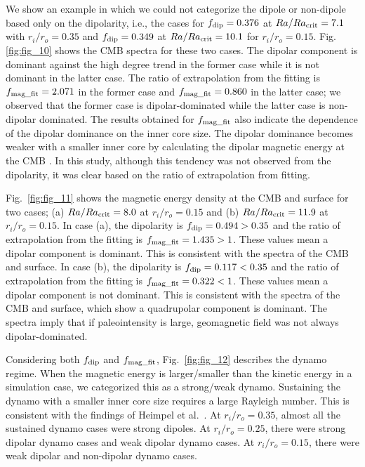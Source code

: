 We show an example in which we could not categorize the dipole or non-dipole based only on the dipolarity, i.e., the cases for $f_{\rm dip} = 0.376$ at $Ra/Ra_{\rm crit} = 7.1$ with $r_i/r_o = 0.35$ and $f_{\rm dip} = 0.349$ at $Ra/Ra_{\rm crit} = 10.1$ for $r_i/r_o = 0.15$. 
Fig. \ref{fig:fig_10} shows the CMB spectra for these two cases. 
The dipolar component is dominant against the high degree trend in the former case while it is not dominant in the latter case. 
The ratio of extrapolation from the fitting is $f_{\rm mag\_fit} = 2.071$ in the former case and $f_{\rm mag\_fit} = 0.860$ in the latter case; we observed that the former case is dipolar-dominated while the latter case is non-dipolar dominated. 
The results obtained for $f_{\rm mag\_fit}$  also indicate the dependence of the dipolar dominance on the inner core size. 
The dipolar dominance becomes weaker with a smaller inner core by calculating the dipolar magnetic energy at the CMB \cite{Heimpel:2005}. 
In this study, although this tendency was not observed from the dipolarity, it was clear based on the ratio of extrapolation from fitting.

{\color{red}
Fig.~\ref{fig:fig_11} shows the magnetic energy density at the CMB and surface for two cases; (a) $Ra/Ra_{\rm crit} = 8.0$ at $r_i/r_o = 0.15$ and (b) $Ra/Ra_{\rm crit} = 11.9$ at $r_i/r_o = 0.15$. 
In case (a), the dipolarity is $f_{\rm dip} = 0.494 > 0.35$ and the ratio of extrapolation from the fitting is $f_{\rm mag\_fit} = 1.435 > 1$. 
These values mean a dipolar component is dominant. 
This is consistent with the spectra of the CMB and surface. 
In case (b), the dipolarity is $f_{\rm dip} = 0.117 < 0.35$ and the ratio of extrapolation from the fitting is $f_{\rm mag\_fit} = 0.322 < 1$. 
These values mean a dipolar component is not dominant. 
This is consistent with the spectra of the CMB and surface, which show a quadrupolar component is dominant. 
The spectra imply that if paleointensity is large, geomagnetic field was not always dipolar-dominated.
}

Considering both $f_{\rm dip}$ and $f_{\rm mag\_fit}$, Fig.~{\color{red}\ref{fig:fig_12}
} describes the dynamo regime. 
When the magnetic energy is larger/smaller than the kinetic energy in a simulation case, we categorized this as a strong/weak dynamo. 
Sustaining the dynamo with a smaller inner core size requires a large Rayleigh number. 
This is consistent with the findings of Heimpel et al.\ . 
At $r_i/r_o = 0.35$, almost all the sustained dynamo cases were strong dipoles. 
At $r_i/r_o = 0.25$, there were strong dipolar dynamo cases and weak dipolar dynamo cases. 
At $r_i/r_o = 0.15$, there were weak dipolar and non-dipolar dynamo cases.

